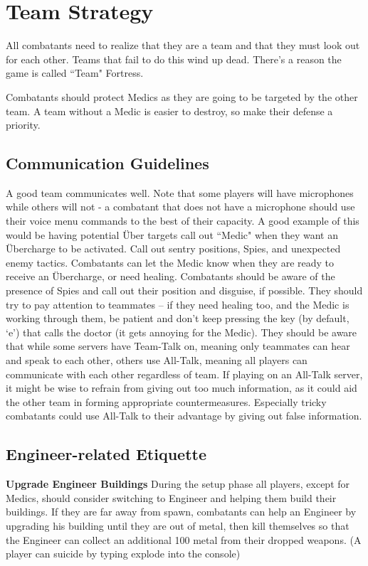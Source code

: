 \section{Team Strategy}
\label{Team_Strategy}
All combatants need to realize that they are a team and that they must look out for each other. Teams that fail to do this wind up dead. There's a reason the game is called ``Team" Fortress.

Combatants should protect Medics as they are going to be targeted by the other team. A team without a Medic is easier to destroy, so make their defense a priority.

\subsection{Communication Guidelines}
A good team communicates well. Note that some players will have microphones while others will not - a combatant that does not have a microphone should use their voice menu commands to the best of their capacity. A good example of this would be having potential Über targets call out ``Medic" when they want an Übercharge to be activated. Call out sentry positions, Spies, and unexpected enemy tactics.  Combatants can let the Medic know when they are ready to receive an Übercharge, or need healing. Combatants should be aware of the presence of Spies and call out their position and disguise, if possible. They should try to pay attention to teammates -- if they need healing too, and the Medic is working through them, be patient and don't keep pressing the key (by default, `e') that calls the doctor (it gets annoying for the Medic).  They should be aware that while some servers have Team-Talk on, meaning only teammates can hear and speak to each other, others use All-Talk, meaning all players can communicate with each other regardless of team.  If playing on an All-Talk server, it might be wise to refrain from giving out too much information, as it could aid the other team in forming appropriate countermeasures.  Especially tricky combatants could use All-Talk to their advantage by giving out false information.

\subsection{Engineer-related Etiquette}
\textbf{Upgrade Engineer Buildings} During the setup phase all players, except for Medics, should consider switching to Engineer and helping them build their buildings. If they are far away from spawn, combatants can help an Engineer by upgrading his building until they are out of metal, then kill
themselves so that the Engineer can collect an additional 100 metal from their dropped weapons. (A player can suicide by typing explode into the console)

